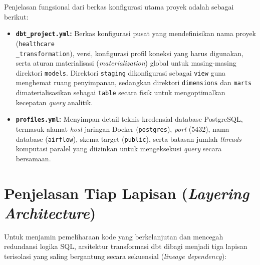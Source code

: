 Penjelasan fungsional dari berkas konfigurasi utama proyek adalah sebagai berikut:
 
\begin{itemize}
    \item \textbf{\texttt{dbt\_project.yml}:} Berkas konfigurasi pusat yang mendefinisikan nama proyek (\texttt{healthcare\\\_transformation}), versi, konfigurasi profil koneksi yang harus digunakan, serta aturan materialisasi (\textit{materialization}) global untuk masing-masing direktori \texttt{models}. Direktori \texttt{staging} dikonfigurasi sebagai \texttt{view} guna menghemat ruang penyimpanan, sedangkan direktori \texttt{dimensions} dan \texttt{marts} dimaterialisasikan sebagai \texttt{table} secara fisik untuk mengoptimalkan kecepatan \textit{query} analitik.
 
    \item \textbf{\texttt{profiles.yml}:} Menyimpan detail teknis kredensial database PostgreSQL, termasuk alamat \textit{host} jaringan Docker (\texttt{postgres}), \textit{port} (5432), nama database (\texttt{airflow}), skema target (\texttt{public}), serta batasan jumlah \textit{threads} komputasi paralel yang diizinkan untuk mengeksekusi \textit{query} secara bersamaan.
\end{itemize}
 
\section{Penjelasan Tiap Lapisan (\textit{Layering Architecture})}
 
Untuk menjamin pemeliharaan kode yang berkelanjutan dan mencegah redundansi logika SQL, arsitektur transformasi dbt dibagi menjadi tiga lapisan terisolasi yang saling bergantung secara sekuensial (\textit{lineage dependency}):
 
\begin{center}
\end{center}
 
